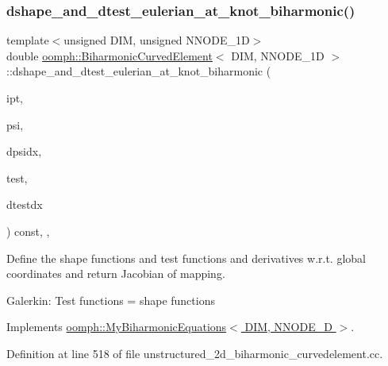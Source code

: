\subsubsection{\texorpdfstring{dshape\+\_\+and\+\_\+dtest\+\_\+eulerian\+\_\+at\+\_\+knot\+\_\+biharmonic()}{dshape\_and\_dtest\_eulerian\_at\_knot\_biharmonic()}}
{\footnotesize\ttfamily template$<$unsigned D\+IM, unsigned N\+N\+O\+D\+E\+\_\+1D$>$ \\
double \hyperlink{classoomph_1_1BiharmonicCurvedElement}{oomph\+::\+Biharmonic\+Curved\+Element}$<$ D\+IM, N\+N\+O\+D\+E\+\_\+1D $>$\+::dshape\+\_\+and\+\_\+dtest\+\_\+eulerian\+\_\+at\+\_\+knot\+\_\+biharmonic (\begin{DoxyParamCaption}\item[{const unsigned \&}]{ipt,  }\item[{Shape \&}]{psi,  }\item[{D\+Shape \&}]{dpsidx,  }\item[{Shape \&}]{test,  }\item[{D\+Shape \&}]{dtestdx }\end{DoxyParamCaption}) const\hspace{0.3cm}{\ttfamily [inline]}, {\ttfamily [protected]}, {\ttfamily [virtual]}}

Define the shape functions and test functions and derivatives w.\+r.\+t. global coordinates and return Jacobian of mapping.

Galerkin\+: Test functions = shape functions 

Implements \hyperlink{classoomph_1_1MyBiharmonicEquations_a08e45fddb2c25119e6ba826cd6cafdbf}{oomph\+::\+My\+Biharmonic\+Equations$<$ D\+I\+M, N\+N\+O\+D\+E\+\_\+D $>$}.



Definition at line 518 of file unstructured\+\_\+2d\+\_\+biharmonic\+\_\+curvedelement.\+cc.

\mbox{\label{classoomph_1_1BiharmonicCurvedElement_a3dcacc1730a9bf9bf8f7396a795ce6b6}} 
